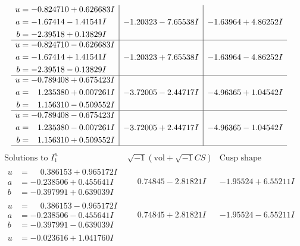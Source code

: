 \documentclass[1p]{elsarticle_modified}
\theoremstyle{definition}
\newcommand{\I}{\sqrt{-1}}
\begin{document}
$$\begin{array}{c|c|c}
\begin{aligned}
u &= -0.824710 + 0.626683 I \\
a &= -1.67414 - 1.41541 I \\
b &= -2.39518 + 0.13829 I\end{aligned}
 & -1.20323 - 7.65538 I & -1.63964 + 4.86252 I \\ \hline\begin{aligned}
u &= -0.824710 - 0.626683 I \\
a &= -1.67414 + 1.41541 I \\
b &= -2.39518 - 0.13829 I\end{aligned}
 & -1.20323 + 7.65538 I & -1.63964 - 4.86252 I \\ \hline\begin{aligned}
u &= -0.789408 + 0.675423 I \\
a &= \phantom{-}1.235380 + 0.007261 I \\
b &= \phantom{-}1.156310 - 0.509552 I\end{aligned}
 & -3.72005 - 2.44717 I & -4.96365 + 1.04542 I \\ \hline\begin{aligned}
u &= -0.789408 - 0.675423 I \\
a &= \phantom{-}1.235380 - 0.007261 I \\
b &= \phantom{-}1.156310 + 0.509552 I\end{aligned}
 & -3.72005 + 2.44717 I & -4.96365 - 1.04542 I\\
 \hline 
 \end{array}$$\newpage$$\begin{array}{c|c|c}  
\text{Solutions to }I^u_{1}& \I (\text{vol} + \sqrt{-1}CS) & \text{Cusp shape}\\
 \hline 
\begin{aligned}
u &= \phantom{-}0.386153 + 0.965172 I \\
a &= -0.238506 + 0.455641 I \\
b &= -0.397991 + 0.639039 I\end{aligned}
 & \phantom{-}0.74845 - 2.81821 I & -1.95524 + 6.55211 I \\ \hline\begin{aligned}
u &= \phantom{-}0.386153 - 0.965172 I \\
a &= -0.238506 - 0.455641 I \\
b &= -0.397991 - 0.639039 I\end{aligned}
 & \phantom{-}0.74845 + 2.81821 I & -1.95524 - 6.55211 I \\ \hline\begin{aligned}
u &= -0.023616 + 1.041760 I \\

\end{aligned}
\end{array}$$
\end{document}

